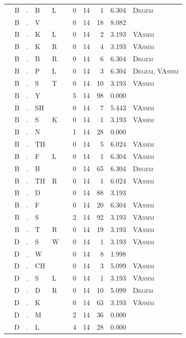 \documentclass[12pt]{article}
\begin{document}
\begin{longtable}{r@{ } r@{ } c@{ } l@{ } l@{ } l@{ } r r r r l }
 & B & . & B & L &  & 0 & 14 & 1 & 6.304 & \textsc{Degem} \\
 & B & . & V &  &  & 0 & 14 & 18 & 8.082 &  \\
 & B & . & K & L &  & 0 & 14 & 2 & 3.193 & \textsc{VAssim} \\
 & B & . & K & R &  & 0 & 14 & 4 & 3.193 & \textsc{VAssim} \\
 & B & . & B & R &  & 0 & 14 & 6 & 6.304 & \textsc{Degem} \\
 & B & . & P & L &  & 0 & 14 & 3 & 6.304 & \textsc{Degem}, \textsc{VAssim} \\
 & B & . & S & T &  & 0 & 14 & 10 & 3.193 & \textsc{VAssim} \\
 & B & . & Y &  &  & 5 & 14 & 98 & 0.000 &  \\
 & B & . & SH &  &  & 0 & 14 & 7 & 5.443 & \textsc{VAssim} \\
 & B & . & S & K &  & 0 & 14 & 1 & 3.193 & \textsc{VAssim} \\
 & B & . & N &  &  & 1 & 14 & 28 & 0.000 &  \\
 & B & . & TH &  &  & 0 & 14 & 5 & 6.024 & \textsc{VAssim} \\
 & B & . & F & L &  & 0 & 14 & 1 & 6.304 & \textsc{VAssim} \\
 & B & . & B &  &  & 0 & 14 & 65 & 6.304 & \textsc{Degem} \\
 & B & . & TH & R &  & 0 & 14 & 1 & 6.024 & \textsc{VAssim} \\
 & B & . & D &  &  & 0 & 14 & 88 & 3.193 &  \\
 & B & . & F &  &  & 0 & 14 & 20 & 6.304 & \textsc{VAssim} \\
 & B & . & S &  &  & 2 & 14 & 92 & 3.193 & \textsc{VAssim} \\
 & B & . & T & R &  & 0 & 14 & 19 & 3.193 & \textsc{VAssim} \\
 & D & . & S & W &  & 0 & 14 & 1 & 3.193 & \textsc{VAssim} \\
 & D & . & W &  &  & 0 & 14 & 8 & 1.998 &  \\
 & D & . & CH &  &  & 0 & 14 & 3 & 5.099 & \textsc{VAssim} \\
 & D & . & S & L &  & 0 & 14 & 1 & 3.193 & \textsc{VAssim} \\
 & D & . & D & R &  & 0 & 14 & 10 & 5.099 & \textsc{Degem} \\
 & D & . & K &  &  & 0 & 14 & 63 & 3.193 & \textsc{VAssim} \\
 & D & . & M &  &  & 2 & 14 & 36 & 0.000 &  \\
 & D & . & L &  &  & 4 & 14 & 28 & 0.000 &  \\

\end{longtable}
\end{document}
